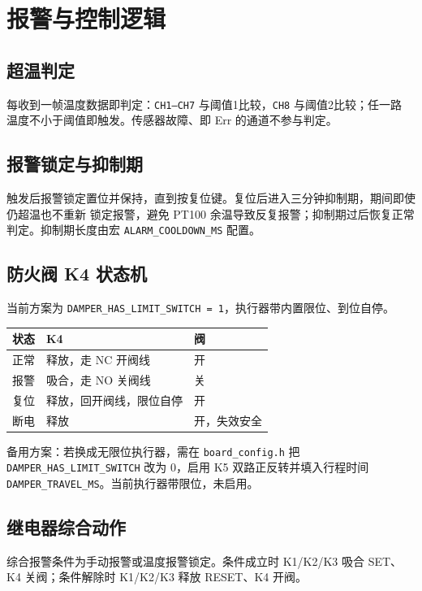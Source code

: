 \documentclass[a4paper,11pt]{ctexart}
\newenvironment{notebox}[1][red!7]{%
  \def\noteboxcolor{#1}%
  \par\smallskip\noindent
  \begin{lrbox}{\noteboxsave}%
  \begin{minipage}{\dimexpr\linewidth-2\fboxsep-2\fboxrule\relax}\small\setlength{\parskip}{2pt}}%
  {\end{minipage}\end{lrbox}%
  \fcolorbox{black!35}{\noteboxcolor}{\usebox{\noteboxsave}}\par\smallskip}
\begin{document}
\section{报警与控制逻辑}
\subsection{超温判定}
每收到一帧温度数据即判定：\texttt{CH1--CH7} 与阈值1比较，\texttt{CH8} 与阈值2比较；任一路
温度不小于阈值即触发。传感器故障、即 Err 的通道不参与判定。

\subsection{报警锁定与抑制期}
触发后报警锁定置位并保持，直到按复位键。复位后进入三分钟抑制期，期间即使仍超温也不重新
锁定报警，避免 PT100 余温导致反复报警；抑制期过后恢复正常判定。抑制期长度由宏
\texttt{ALARM\_COOLDOWN\_MS} 配置。

\subsection{防火阀 K4 状态机}\label{sub:damper-fsm}
当前方案为 \texttt{DAMPER\_HAS\_LIMIT\_SWITCH = 1}，执行器带内置限位、到位自停。
\renewcommand{\arraystretch}{1.3}
\begin{center}
\begin{tabular}{|l|l|l|}
\hline
状态 & K4 & 阀\\
\hline
正常 & 释放，走 NC 开阀线 & 开\\
\hline
报警 & 吸合，走 NO 关阀线 & 关\\
\hline
复位 & 释放，回开阀线，限位自停 & 开\\
\hline
断电 & 释放 & 开，失效安全\\
\hline
\end{tabular}
\end{center}
\renewcommand{\arraystretch}{1.0}
\begin{notebox}[blue!6]
备用方案：若换成无限位执行器，需在 \texttt{board\_config.h} 把
\texttt{DAMPER\_HAS\_LIMIT\_SWITCH} 改为 0，启用 K5 双路正反转并填入行程时间
\texttt{DAMPER\_TRAVEL\_MS}。当前执行器带限位，未启用。
\end{notebox}

\subsection{继电器综合动作}
综合报警条件为手动报警或温度报警锁定。条件成立时 K1/K2/K3 吸合 SET、K4 关阀；条件解除时
K1/K2/K3 释放 RESET、K4 开阀。
\end{document}
